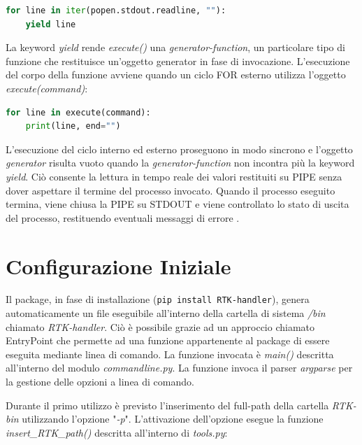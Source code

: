 \documentclass[a4paper,12pt, doubleside]{report}
\begin{document}
                \begin{lstlisting}[language=python, frame=bt]
for line in iter(popen.stdout.readline, ""):
    yield line
                \end{lstlisting}
                        
                La keyword \textit{yield} \cite{python-yield} rende \textit{execute()} una \textit{generator-function}, un particolare tipo di funzione che restituisce un'oggetto generator \cite{python-generator} in fase di invocazione. L'esecuzione del corpo della funzione avviene quando un ciclo FOR esterno utilizza l'oggetto \textit{execute(command)}:
                        
                \begin{lstlisting}[language=python, frame=bt]
for line in execute(command):
    print(line, end="")
                \end{lstlisting}
                
                L'esecuzione del ciclo interno ed esterno proseguono in modo sincrono e l'oggetto \textit{generator} risulta vuoto quando la \textit{generator-function} non incontra più la keyword \textit{yield}. Ciò consente la lettura in tempo reale dei valori restituiti su PIPE senza dover aspettare il termine del processo invocato. Quando il processo eseguito termina, viene chiusa la PIPE su STDOUT e viene controllato lo stato di uscita del processo, restituendo eventuali messaggi di errore \cite{subprocess-calledprocesserror}.
            
        \section{Configurazione Iniziale}
        \label{sec:configurazione-iniziale}
            \par
                Il package, in fase di installazione (\texttt{pip install RTK-handler}), genera automaticamente un file eseguibile all'interno della cartella di sistema \textit{/bin} chiamato \textit{RTK-handler}. Ciò è possibile grazie ad un approccio chiamato EntryPoint \cite{python-entry-point} che permette ad una funzione appartenente al package di essere eseguita mediante linea di comando. La funzione invocata è \textit{main()} descritta all'interno del modulo \textit{command\textunderscore line.py}. La funzione invoca il parser \textit{argparse} \cite{python-argparse} per la gestione delle opzioni a linea di comando.
                
            \bigskip
            \par
                Durante il primo utilizzo è previsto l'inserimento del full-path della cartella \textit{RTK-bin} utilizzando l'opzione "\textit{-p}". L'attivazione dell'opzione esegue la funzione \textit{insert\_RTK\_path()} descritta all'interno di \textit{tools.py}:      
            
\end{document}

